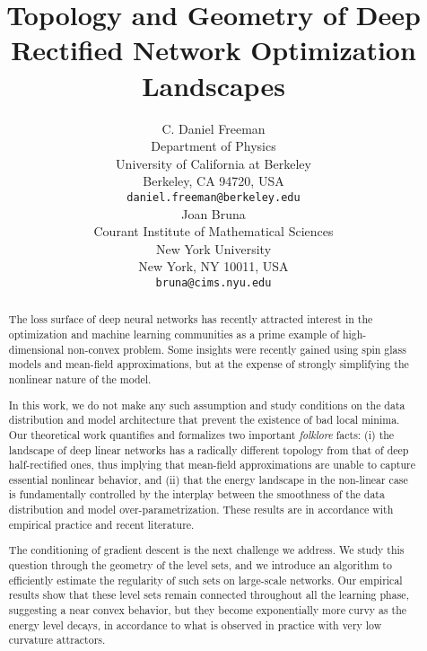 \documentclass{article} %
\title{Topology and Geometry of Deep Rectified Network Optimization Landscapes }
\author{C. Daniel Freeman  \\
Department of Physics\\
University of California at Berkeley\\
Berkeley, CA 94720, USA \\
\texttt{daniel.freeman@berkeley.edu} \\
\And
Joan Bruna \\
Courant Institute of Mathematical Sciences \\
New York University \\
New York, NY 10011, USA \\
\texttt{bruna@cims.nyu.edu} \\
}
\begin{document}
\maketitle

\begin{abstract}
The loss surface of deep neural networks has recently attracted interest 
in the optimization and machine learning communities as a prime example of 
high-dimensional non-convex problem. Some insights were recently gained using spin glass 
models and mean-field approximations, but at the expense of strongly simplifying the nonlinear nature of the model.

In this work, we do not make any such assumption and study conditions 
on the data distribution and model architecture that prevent the existence 
of bad local minima. Our theoretical work quantifies and formalizes two 
important \emph{folklore} facts: (i) the landscape of deep linear networks has a radically different topology 
from that of deep half-rectified ones, thus implying that mean-field approximations
are unable to capture essential nonlinear behavior, and (ii) that the energy landscape 
in the non-linear case is fundamentally controlled by the interplay between the smoothness of the data distribution and model over-parametrization. 
These results are in accordance with empirical practice and recent literature. 

The conditioning of gradient descent is the next challenge we address. 
We study this question through the geometry of the level sets, and we introduce
an algorithm to efficiently estimate the regularity of such sets on large-scale networks. 
Our empirical results show that these level sets remain connected throughout 
all the learning phase, suggesting a near convex behavior, but they become 
exponentially more curvy as the energy level decays, in accordance to what is observed in practice with 
very low curvature attractors.
\end{abstract}









  




 




\appendix



\end{document}
